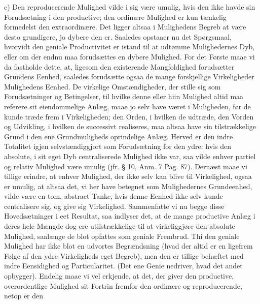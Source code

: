 \documentclass[12pt]{book}
\newcommand{\opage}[1]{\marginnote{\footnotesize\textit{[#1]}}}
\begin{document}
c) Den reproducerende Mulighed vilde i sig være umulig, hvis den ikke havde sin Forudsætning
i den productive; den ordinære Mulighed er kun tænkelig formedelst den extraordinære. Det
ligger altsaa i Mulighedens Begreb at være desto grundigere, jo dybere den er. Saaledes
opstaaer nu det Spørgsmaal, hvorvidt den geniale Productivitet er istand til at udtømme
Mulighedernes Dyb, eller om der endnu maa forudsættes en dybere Mulighed. For det Første maae
vi da fastholde dette, at, ligesom den existerende Mangfoldighed forudsætter Grundens Eenhed,
saaledes forudsætte ogsaa de mange forskjellige Virkeligheder Mulighedens Eenhed. De
virkelige Omstændigheder, der stille sig som Forudsætninger og Betingelser, til hvilke denne
eller hiin Mulighed altid maa referere sit eiendommelige Anlæg, maae jo selv have været i
Muligheden, før de kunde træde frem i Virkeligheden; den Orden, i hvilken de udtræde, den
Vorden og Udvikling, i hvilken de successivt realiseres, maa altsaa have sin tilstrækkelige
Grund i den ene Grundmuligheds oprindelige Anlæg. Herved er den indre Totalitet igjen
selvstændiggjort som Forudsætning for den ydre: hvis den absolute, i sit eget Dyb
centraliserede Mulighed ikke var, saa vilde enhver partiel og relativ Mulighed være umulig
(jfr. § 10, Anm. 7 Pag. 87). Dernæst maae vi tillige erindre, at enhver Mulighed, der ikke
selv kan blive til Virkelighed, ogsaa er umulig, at altsaa det, vi her have betegnet som
Mulighedernes Grundeenhed, vilde være en tom, abstract Tanke, hvis denne Eenhed ikke selv
kunde centralisere sig, og give sig Virkelighed. Sammenfatte vi nu begge disse
Hovedsætninger i eet Resultat, saa indlyser det, at de mange productive Anlæg i deres hele
\opage{156} Mængde dog ere utilstrækkelige til at virkeliggjøre den absolute Mulighed, saalænge de blot
opfattes som geniale Frembrud. Thi den geniale Mulighed har ikke blot en udvortes
Begrændsning (hvad der altid er en ligefrem Følge af den ydre Virkeligheds eget Begreb), men
den er tillige behæftet med indre Eensidighed og Particularitet. (Det ene Genie nedriver,
hvad det andet opbygger). Endelig maae vi vel erkjende, at det, der giver den productive,
overordentlige Mulighed sit Fortrin fremfor den ordinære og reproducerende, netop er den
\end{document}
